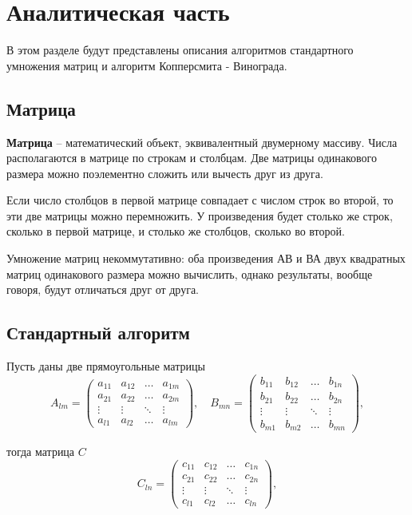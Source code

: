 \chapter{Аналитическая часть}
В этом разделе будут представлены описания алгоритмов стандартного умножения матриц и алгоритм Копперсмита - Винограда.

\section{Матрица}

\textbf{Матрица} \cite{matrix} – математический объект, эквивалентный двумерному массиву. Числа располагаются в матрице по строкам и столбцам. Две матрицы одинакового размера можно поэлементно сложить или вычесть друг из друга.

Если число столбцов в первой матрице совпадает с числом строк во второй, то эти две матрицы можно перемножить. У произведения будет столько же строк, сколько в первой матрице, и столько же столбцов, сколько во второй. 

Умножение матриц некоммутативно: оба произведения АВ и ВА двух квадратных матриц одинакового размера можно вычислить, однако результаты, вообще говоря, будут отличаться друг от друга.

\newpage
\section{Стандартный алгоритм}

Пусть даны две прямоугольные матрицы
\begin{equation}
	A_{lm} = \begin{pmatrix}
		a_{11} & a_{12} & \ldots & a_{1m}\\
		a_{21} & a_{22} & \ldots & a_{2m}\\
		\vdots & \vdots & \ddots & \vdots\\
		a_{l1} & a_{l2} & \ldots & a_{lm}
	\end{pmatrix},
	\quad
	B_{mn} = \begin{pmatrix}
		b_{11} & b_{12} & \ldots & b_{1n}\\
		b_{21} & b_{22} & \ldots & b_{2n}\\
		\vdots & \vdots & \ddots & \vdots\\
		b_{m1} & b_{m2} & \ldots & b_{mn}
	\end{pmatrix},
\end{equation}

тогда матрица $C$
\begin{equation}
	C_{ln} = \begin{pmatrix}
		c_{11} & c_{12} & \ldots & c_{1n}\\
		c_{21} & c_{22} & \ldots & c_{2n}\\
		\vdots & \vdots & \ddots & \vdots\\
		c_{l1} & c_{l2} & \ldots & c_{ln}
	\end{pmatrix},
\end{equation}

